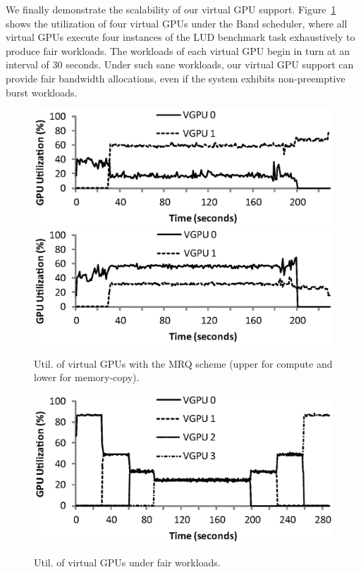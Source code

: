 We finally demonstrate the scalability of our virtual GPU support.
Figure~\ref{fig:vgpu_fair_4_band} shows the utilization of four virtual
GPUs under the Band scheduler, where all virtual GPUs execute four
instances of the LUD benchmark task exhaustively to produce fair
workloads.
The workloads of each virtual GPU begin in turn at an interval of 30
seconds.
Under such sane workloads, our virtual GPU support can provide fair
bandwidth allocations, even if the system exhibits non-preemptive burst
workloads.

\begin{figure}[t]
 \begin{center}
  \includegraphics[width=0.9\hsize]{eps/vgpu_2_band_compute.eps}\\
  \vspace{-0.5em}
  \includegraphics[width=0.9\hsize]{eps/vgpu_2_band_memory.eps}\\
  \vspace{-1.5em}
  \caption{Util. of virtual GPUs with the MRQ scheme (upper for compute
  and lower for memory-copy).}
  \label{fig:vgpu_2_band_mrq}
 \end{center}
 \begin{center}
  \includegraphics[width=0.9\hsize]{eps/vgpu_fair_4_band.eps}\\
  \vspace{-1.5em}
  \caption{Util. of virtual GPUs under fair workloads.}
  \label{fig:vgpu_fair_4_band}
 \end{center}
  \vspace{-1.5em}
\end{figure}
